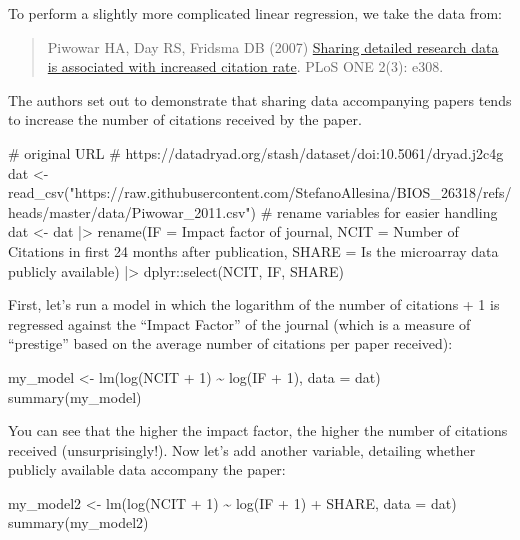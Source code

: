 \documentclass[
  letterpaper,
  DIV=11,
  numbers=noendperiod]{scrreprt}
\newenvironment{Shaded}{\begin{snugshade}}{\end{snugshade}}
\newcommand{\NormalTok}[1]{\textcolor[rgb]{0.00,0.23,0.31}{#1}}
\begin{document}
To perform a slightly more complicated linear regression, we take the
data from:

\begin{quote}
Piwowar HA, Day RS, Fridsma DB (2007)
\href{https://doi.org/10.1371/journal.pone.0000308}{Sharing detailed
research data is associated with increased citation rate}. PLoS ONE
2(3): e308.
\end{quote}

The authors set out to demonstrate that sharing data accompanying papers
tends to increase the number of citations received by the paper.

\begin{Shaded}
\begin{Highlighting}[]
\NormalTok{\# original URL }
\NormalTok{\# https://datadryad.org/stash/dataset/doi:10.5061/dryad.j2c4g}
\NormalTok{dat \textless{}{-} read\_csv("https://raw.githubusercontent.com/StefanoAllesina/BIOS\_26318/refs/heads/master/data/Piwowar\_2011.csv") }
\NormalTok{\# rename variables for easier handling}
\NormalTok{dat \textless{}{-} dat |\textgreater{} rename(IF = \textasciigrave{}Impact factor of journal\textasciigrave{}, }
\NormalTok{                      NCIT = \textasciigrave{}Number of Citations in first 24 months after publication\textasciigrave{}, }
\NormalTok{                      SHARE = \textasciigrave{}Is the microarray data publicly available\textasciigrave{}) |\textgreater{} }
\NormalTok{      dplyr::select(NCIT, IF, SHARE)}
\end{Highlighting}
\end{Shaded}

First, let's run a model in which the logarithm of the number of
citations + 1 is regressed against the ``Impact Factor'' of the journal
(which is a measure of ``prestige'' based on the average number of
citations per paper received):

\begin{Shaded}
\begin{Highlighting}[]
\NormalTok{my\_model \textless{}{-} lm(log(NCIT + 1) \textasciitilde{} log(IF + 1), data = dat)}
\NormalTok{summary(my\_model)}
\end{Highlighting}
\end{Shaded}

You can see that the higher the impact factor, the higher the number of
citations received (unsurprisingly!). Now let's add another variable,
detailing whether publicly available data accompany the paper:

\begin{Shaded}
\begin{Highlighting}[]
\NormalTok{my\_model2 \textless{}{-} lm(log(NCIT + 1) \textasciitilde{} log(IF + 1) + SHARE, data = dat)}
\NormalTok{summary(my\_model2)}
\end{Highlighting}
\end{Shaded}
\end{document}
